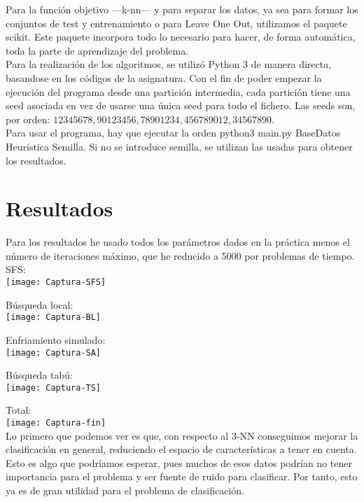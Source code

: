Para la función objetivo ---k-nn--- y para separar los datos, ya sea para formar los conjuntos de test y entrenamiento o para Leave One Out, utilizamos el paquete scikit. Este paquete incorpora todo lo necesario para hacer, de forma automática, toda la parte de aprendizaje del problema.\\

Para la realización de los algoritmos, se utilizó Python 3 de manera directa, basandose en los códigos de la asignatura. Con el fin de poder empezar la ejecución del programa desde una partición intermedia, cada partición tiene una seed asociada en vez de usarse una única seed para todo el fichero. Las seeds son, por orden: $12345678,90123456,78901234,456789012,34567890$. \\

Para usar el programa, hay que ejecutar la orden  python3 main.py BaseDatos Heurística Semilla. Si no se introduce semilla, se utilizan las usadas para obtener los resultados.
\newpage
\section{Resultados}
Para los resultados he usado todos los parámetros dados en la práctica menos el número de iteraciones máximo, que he reducido a 5000 por problemas de tiempo.\\

SFS:\\

\texttt{[image: Captura-SFS]}

Búsqueda local:\\

\texttt{[image: Captura-BL]}

Enfriamiento simulado:\\

\texttt{[image: Captura-SA]}

Búsqueda tabú:\\

\texttt{[image: Captura-TS]}

Total:\\

\texttt{[image: Captura-fin]}\\


Lo primero que podemos ver es que, con respecto al 3-NN conseguimos mejorar la clasificación en general, reduciendo el espacio de características a tener en cuenta. Esto es algo que podríamos esperar, pues muchos de esos datos podrían no tener importancia para el problema y ser fuente de ruido para clasificar. Por tanto, esto ya es de gran utilidad para el problema de clasificación.\\

